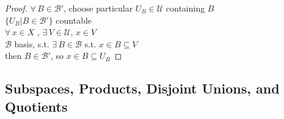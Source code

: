 \documentclass[twoside]{amsart}
\theoremstyle{plain}
\theoremstyle{definition}
\begin{document}
\begin{appendix}
\begin{proof}
$\forall \, B \in \mathcal{B}'$, choose particular $U_B \in \mathcal{U}$ containing $B$ \\

$\lbrace U_B | B \in \mathcal{B}'\rbrace$ countable \\

$\forall \, x \in X$ , $\exists \, V \in \mathcal{U}$, $x\in V$ \\
$\mathcal{B} $ basis, s.t. $\exists \, B \in \mathcal{B}$ s.t. $x\in B \subseteq V$ \\
then $B \in \mathcal{B}'$, so $x\in B \subseteq U_B$
\end{proof} 

\subsection*{Subspaces, Products, Disjoint Unions, and Quotients }







\end{appendix}
\end{document}
